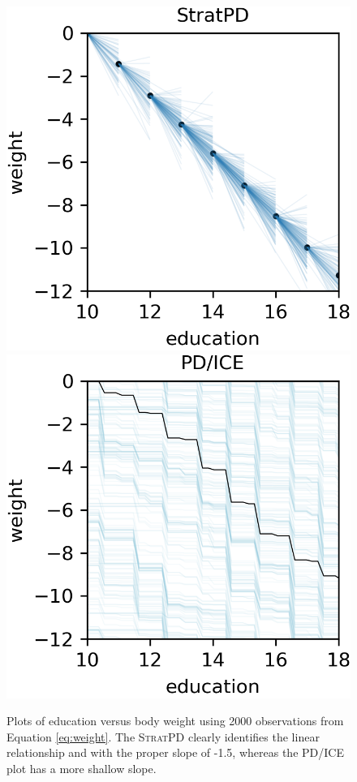 \documentclass[12pt]{article}
\newcommand{\spd}{\fontfamily{cmr}\textsc{\small StratPD}}
\begin{document}
\begin{figure}[htbp]
\begin{center}
\includegraphics[scale=0.7]{images/education_vs_weight_stratpd.png}
\includegraphics[scale=0.7]{images/education_vs_weight_pdp.png}
\caption{Plots of education versus body weight using 2000 observations from Equation \eqref{eq:weight}. The \spd{} clearly identifies the linear relationship and with the proper slope of -1.5, whereas the PD/ICE plot has a more shallow slope.}
\label{fig:education_vs_weight}
\end{center}
\end{figure}
\end{document}
